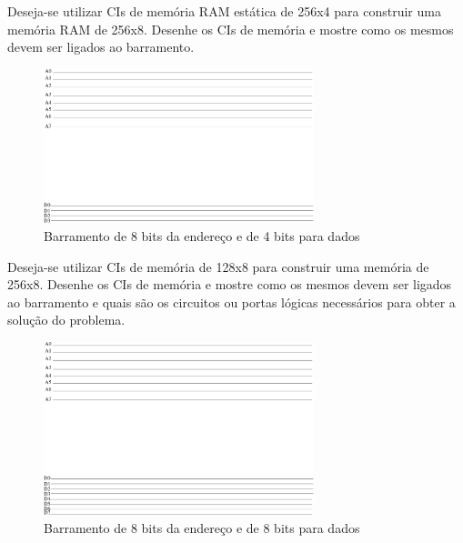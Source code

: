 \documentclass[a4paper,10pt]{article}
\begin{document}

\begin{center}
\large{}
\end{center}





 Deseja-se utilizar CIs de  memória RAM
estática  de 256x4 para construir uma memória RAM de 256x8. Desenhe os CIs de memória e mostre como os mesmos devem ser ligados ao barramento. 

\begin{figure}[H]
 \centering\includegraphics[width=0.7\textwidth]{memoria}
 \caption{Barramento de 8 bits da endereço e de 4 bits para dados}
 \label{fig:memoria}
\end{figure}


 Deseja-se utilizar CIs de  memória de
128x8 para construir uma memória de 256x8. Desenhe os CIs de memória e mostre como os mesmos devem ser ligados ao barramento e quais são os circuitos ou portas
lógicas necessários para obter a solução do problema.


\begin{figure}[H]
 \centering\includegraphics[width=0.7\textwidth]{memoria2}
 \caption{Barramento de 8 bits da endereço e de 8 bits para dados}
 \label{fig:memoria2}
\end{figure}
\end{document}
